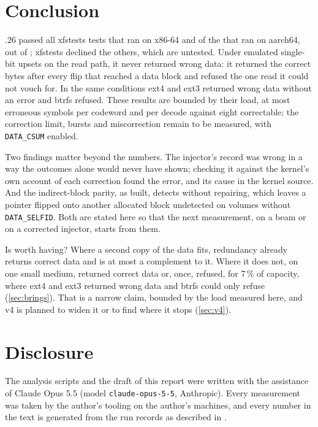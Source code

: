 \section{Conclusion}\label{sec:conclusion}

.26 passed all \xfsXRan{} xfstests tests that ran on x86-64
and \xfsAPass{} of the \xfsARan{} that ran on aarch64, out of
\xfsTotal{}; xfstests declined the others, which are untested. Under
emulated single-bit upsets on the read path, it never returned wrong
data: it returned the correct bytes after every
flip that reached a data block and refused the one read it could not
vouch for. In the same
conditions ext4 and ext3 returned wrong data without an error and btrfs
refused. These results are bounded by their load, at most
 erroneous symbols per codeword and per decode against
eight correctable; the correction limit, bursts and miscorrection remain
to be measured, with \texttt{DATA\_CSUM} enabled.

Two findings matter beyond the numbers. The injector's record was wrong
in a way the outcomes alone would never have shown; checking it against
the kernel's own account of each correction found the error, and its
cause in the kernel source. And the indirect-block parity, as built,
detects without repairing, which leaves a pointer flipped onto another
allocated block undetected on volumes without \texttt{DATA\_SELFID}.
Both are stated here so that the next measurement, on a beam or on a
corrected injector, starts from them.

Is \bfs worth having? Where a second copy of the data fits, redundancy
already returns correct data and \bfs is at most a complement to it.
Where it does not, on one small medium, \bfs returned correct data or,
once, refused, for 7\,\% of capacity, where ext4 and ext3 returned wrong
data and btrfs could only refuse (\cref{sec:brings}). That is a narrow claim,
bounded by the load measured here, and v4 is planned to widen it or to
find where it stops (\cref{sec:v4}).

\section*{Disclosure}
The analysis scripts and the draft of this report were written with the
assistance of Claude Opus 5.5 (model \texttt{claude-opus-5-5}, Anthropic). Every
measurement was taken by the author's tooling on the author's machines,
and every number in the text is generated from the run records as
described in \apprepro.
